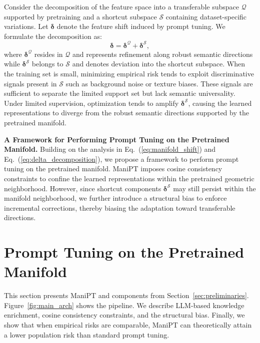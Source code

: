 \documentclass{article}
\theoremstyle{plain}
\theoremstyle{definition}
\theoremstyle{remark}
\begin{document}
	Consider the decomposition of the feature space into a transferable subspace $\mathcal{Q}$ supported by pretraining and a shortcut subspace $\mathcal{S}$ containing dataset-specific variations. Let $\boldsymbol{\delta}$ denote the feature shift induced by prompt tuning. We formulate the decomposition as:
	\begin{equation}
		\label{eq:delta_decomposition}
		\boldsymbol{\delta} = \boldsymbol{\delta}^{\mathcal{Q}} + \boldsymbol{\delta}^{\mathcal{S}},
	\end{equation}
	where $\boldsymbol{\delta}^{\mathcal{Q}}$ resides in $\mathcal{Q}$ and represents refinement along robust semantic directions while $\boldsymbol{\delta}^{\mathcal{S}}$ belongs to $\mathcal{S}$ and denotes deviation into the shortcut subspace. When the training set is small, minimizing empirical risk tends to exploit discriminative signals present in $\mathcal{S}$ such as background noise or texture biases. These signals are sufficient to separate the limited support set but lack semantic universality. Under limited supervision, optimization tends to amplify $\boldsymbol{\delta}^{\mathcal{S}}$, causing the learned representations to diverge from the robust semantic directions supported by the pretrained manifold.
	
	\textbf{A Framework for Performing Prompt Tuning on the Pretrained Manifold.} Building on the analysis in Eq.~(\ref{eq:manifold_shift}) and Eq.~(\ref{eq:delta_decomposition}), we propose a framework to perform prompt tuning on the pretrained manifold. ManiPT imposes cosine consistency constraints to confine the learned representations within the pretrained geometric neighborhood. However, since shortcut components $\boldsymbol{\delta}^{\mathcal{S}}$ may still persist within the manifold neighborhood, we further introduce a structural bias to enforce incremental corrections, thereby biasing the adaptation toward transferable directions.
	\vspace{-10pt}
	\section{Prompt Tuning on the Pretrained Manifold}
	This section presents ManiPT and components from Section~\ref{sec:preliminaries}. Figure~\ref{fig:main_arch} shows the pipeline. We describe LLM-based knowledge enrichment, cosine consistency constraints, and the structural bias. Finally, we show that when empirical risks are comparable, ManiPT can theoretically attain a lower population risk than standard prompt tuning.
	\vspace{-10pt}
\end{document}

